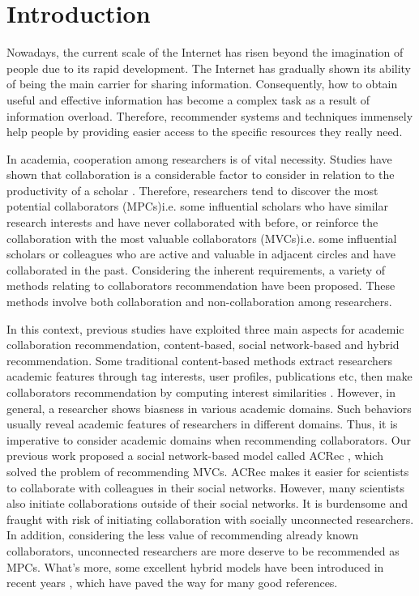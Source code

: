 \documentclass[review]{elsarticle}
\begin{document}
\linenumbers


\section{Introduction}
Nowadays, the current scale of the Internet has risen beyond the imagination of people due to its rapid development. The Internet has gradually shown its ability of being the main carrier for sharing information. Consequently, how to obtain useful and effective information has become a complex task as a result of information overload. Therefore, recommender systems and techniques immensely help people by providing easier access to the specific resources they really need.

In academia, cooperation among researchers is of vital necessity. Studies have shown that collaboration is a considerable factor to consider in relation to the productivity of a scholar \cite{lee2005impact}. Therefore, researchers tend to discover the most potential collaborators (MPCs)i.e. some influential scholars who have similar research interests and have never collaborated with before, or reinforce the collaboration with the most valuable collaborators (MVCs)i.e. some influential scholars or colleagues who are active and valuable in adjacent circles and have collaborated in the past. Considering the inherent requirements, a variety of methods relating to collaborators recommendation have been proposed. These methods involve both collaboration and non-collaboration among researchers.

In this context, previous studies have exploited three main aspects for academic collaboration recommendation, content-based, social network-based and hybrid recommendation. Some traditional content-based methods extract researchers academic features through tag interests, user profiles, publications etc, then make collaborators recommendation by computing interest similarities \cite{lopes2010collaboration,gollapalli2012similar,kim2010collaborative}. However, in general, a researcher shows biasness in various academic domains. Such behaviors usually reveal academic features of researchers in different domains. Thus, it is imperative to consider academic domains when recommending collaborators. Our previous work proposed a social network-based model called ACRec \cite{li2014acrec}, which solved the problem of recommending MVCs. ACRec makes it easier for scientists to collaborate with colleagues in their social networks. However, many scientists also initiate collaborations outside of their social networks. It is burdensome and fraught with risk of initiating collaboration with socially unconnected researchers. In addition, considering the less value of recommending already known collaborators, unconnected researchers are more deserve to be recommended as MPCs. What's more, some excellent hybrid models have been introduced in recent years \cite{lee2011recommending,chen2011collabseer,cohen2013recommending}, which have paved the way for many good references.
\end{document}

